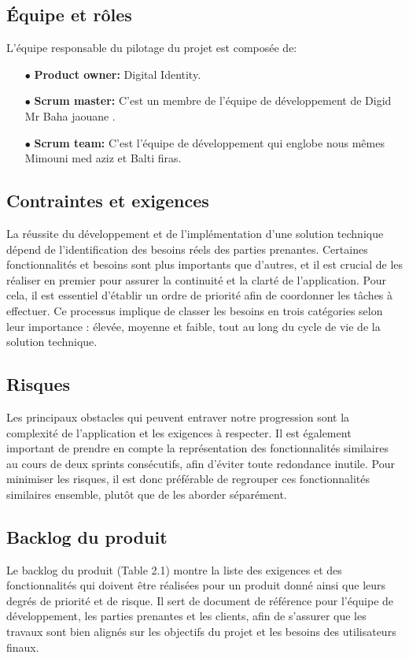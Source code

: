 \subsection{Équipe et rôles}
L'équipe responsable du pilotage du projet est composée de:\\
\begin{itemize}
  \item[$\bullet$]\textbf{Product owner: } Digital Identity.\\
  \item[$\bullet$]\textbf{Scrum master: } C'est un membre de l'équipe de développement de Digid Mr Baha jaouane . \\
  \item[$\bullet$]\textbf{Scrum team: }C'est l'équipe de développement qui englobe nous mêmes Mimouni med aziz  et Balti firas. \\
\end{itemize}
\subsection{Contraintes et exigences}
La réussite du développement et de l'implémentation d'une solution technique dépend de l'identification des besoins réels des parties prenantes. Certaines fonctionnalités et besoins sont plus importants que d'autres, et il est crucial de les réaliser en premier pour assurer la continuité et la clarté de l'application. Pour cela, il est essentiel d'établir un ordre de priorité afin de coordonner les tâches à effectuer. Ce processus implique de classer les besoins en trois catégories selon leur importance : élevée, moyenne et faible, tout au long du cycle de vie de la solution technique.
\subsection{Risques}
Les principaux obstacles qui peuvent entraver notre progression sont la complexité de l'application et les exigences à respecter. Il est également important de prendre en compte la représentation des fonctionnalités similaires au cours de deux sprints consécutifs, afin d'éviter toute redondance inutile. Pour minimiser les risques, il est donc préférable de regrouper ces fonctionnalités similaires ensemble, plutôt que de les aborder séparément.
\subsection{Backlog du produit}
Le backlog du produit (Table 2.1) montre la liste des exigences et des fonctionnalités qui doivent être réalisées pour un produit donné ainsi que leurs degrés de priorité et de risque. Il sert de document de référence pour l'équipe de développement, les parties prenantes et les clients, afin de s'assurer que les travaux sont bien alignés sur les objectifs du projet et les besoins des utilisateurs finaux.



